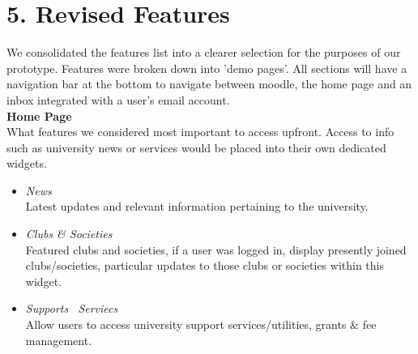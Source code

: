 \pagebreak \section*{5. Revised Features}
We consolidated the features list into a clearer selection for the purposes of our prototype. Features were broken down into 'demo pages'. All sections will have a navigation bar at the bottom to navigate between moodle, the home page and an inbox integrated with a user's email account.\\


\textbf{Home Page}\\
What features we considered most important to access upfront. Access to info such as university news or services would be placed into their own dedicated widgets.
\begin{itemize}
  \item \textit{News}\\
        Latest updates and relevant information pertaining to the university.
  \item \textit{Clubs \& Societies}\\
        Featured clubs and societies, if a user was logged in, display presently joined clubs/societies, particular updates to those clubs or societies within this widget.
  \item \textit{Supports \ Serviecs}\\
        Allow users to access university support services/utilities, grants \& fee management. 
  \end{itemize}


